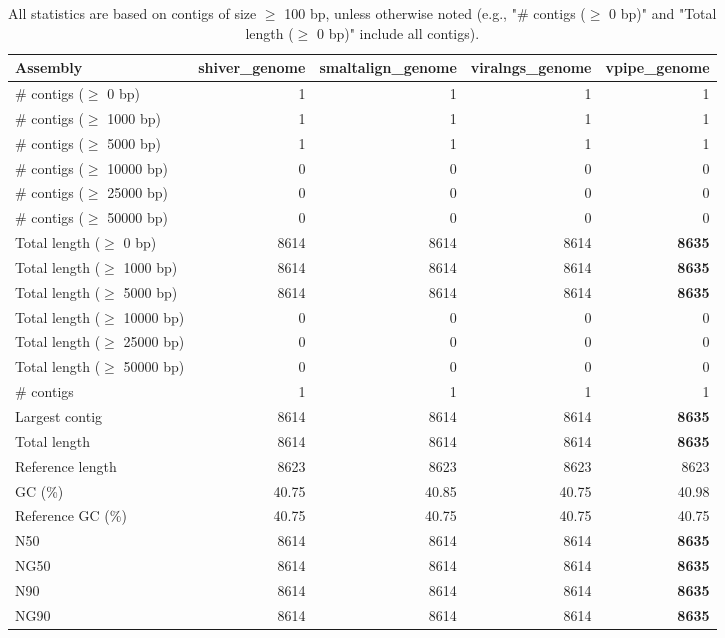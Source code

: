 \documentclass[12pt,a4paper]{article}
\begin{document}
\begin{table}[ht]
\begin{center}
\caption{All statistics are based on contigs of size $\geq$ 100 bp, unless otherwise noted (e.g., "\# contigs ($\geq$ 0 bp)" and "Total length ($\geq$ 0 bp)" include all contigs).}
\begin{tabular}{|l*{4}{|r}|}
\hline
Assembly & shiver\_genome & smaltalign\_genome & viralngs\_genome & vpipe\_genome \\ \hline
\# contigs ($\geq$ 0 bp) & 1 & 1 & 1 & 1 \\ \hline
\# contigs ($\geq$ 1000 bp) & 1 & 1 & 1 & 1 \\ \hline
\# contigs ($\geq$ 5000 bp) & 1 & 1 & 1 & 1 \\ \hline
\# contigs ($\geq$ 10000 bp) & 0 & 0 & 0 & 0 \\ \hline
\# contigs ($\geq$ 25000 bp) & 0 & 0 & 0 & 0 \\ \hline
\# contigs ($\geq$ 50000 bp) & 0 & 0 & 0 & 0 \\ \hline
Total length ($\geq$ 0 bp) & 8614 & 8614 & 8614 & {\bf 8635} \\ \hline
Total length ($\geq$ 1000 bp) & 8614 & 8614 & 8614 & {\bf 8635} \\ \hline
Total length ($\geq$ 5000 bp) & 8614 & 8614 & 8614 & {\bf 8635} \\ \hline
Total length ($\geq$ 10000 bp) & 0 & 0 & 0 & 0 \\ \hline
Total length ($\geq$ 25000 bp) & 0 & 0 & 0 & 0 \\ \hline
Total length ($\geq$ 50000 bp) & 0 & 0 & 0 & 0 \\ \hline
\# contigs & 1 & 1 & 1 & 1 \\ \hline
Largest contig & 8614 & 8614 & 8614 & {\bf 8635} \\ \hline
Total length & 8614 & 8614 & 8614 & {\bf 8635} \\ \hline
Reference length & 8623 & 8623 & 8623 & 8623 \\ \hline
GC (\%) & 40.75 & 40.85 & 40.75 & 40.98 \\ \hline
Reference GC (\%) & 40.75 & 40.75 & 40.75 & 40.75 \\ \hline
N50 & 8614 & 8614 & 8614 & {\bf 8635} \\ \hline
NG50 & 8614 & 8614 & 8614 & {\bf 8635} \\ \hline
N90 & 8614 & 8614 & 8614 & {\bf 8635} \\ \hline
NG90 & 8614 & 8614 & 8614 & {\bf 8635} \\ \hline

\end{tabular}
\end{center}
\end{table}
\end{document}
